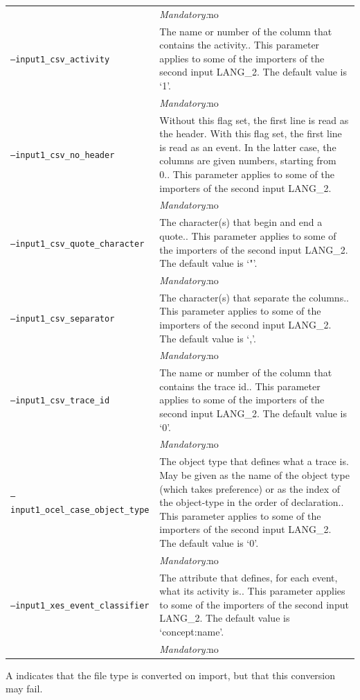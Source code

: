 {\begin{tabularx}{\linewidth}{lX}
&\textit{Mandatory:}\quad no\\
\texttt{--input1\_csv\_activity} & The name or number of the column that contains the activity.. This parameter applies to some of the importers of the second input LANG\_2. The default value is `1'.\\
&\textit{Mandatory:}\quad no\\
\texttt{--input1\_csv\_no\_header} & Without this flag set, the first line is read as the header. 
    With this flag set, the first line is read as an event. In the latter case, the columns are given numbers, starting from 0.. This parameter applies to some of the importers of the second input LANG\_2. \\
&\textit{Mandatory:}\quad no\\
\texttt{--input1\_csv\_quote\_character} & The character(s) that begin and end a quote.. This parameter applies to some of the importers of the second input LANG\_2. The default value is `"'.\\
&\textit{Mandatory:}\quad no\\
\texttt{--input1\_csv\_separator} & The character(s) that separate the columns.. This parameter applies to some of the importers of the second input LANG\_2. The default value is `,'.\\
&\textit{Mandatory:}\quad no\\
\texttt{--input1\_csv\_trace\_id} & The name or number of the column that contains the trace id.. This parameter applies to some of the importers of the second input LANG\_2. The default value is `0'.\\
&\textit{Mandatory:}\quad no\\
\texttt{--input1\_ocel\_case\_object\_type} & The object type that defines what a trace is. May be given as the name of the object type (which takes preference) or as the index of the object-type in the order of declaration.. This parameter applies to some of the importers of the second input LANG\_2. The default value is `0'.\\
&\textit{Mandatory:}\quad no\\
\texttt{--input1\_xes\_event\_classifier} & The attribute that defines, for each event, what its activity is.. This parameter applies to some of the importers of the second input LANG\_2. The default value is `concept:name'.\\
&\textit{Mandatory:}\quad no\\
\bottomrule
\end{tabularx}
A \textdagger{} indicates that the file type is converted on import, but that this conversion may fail.
}
